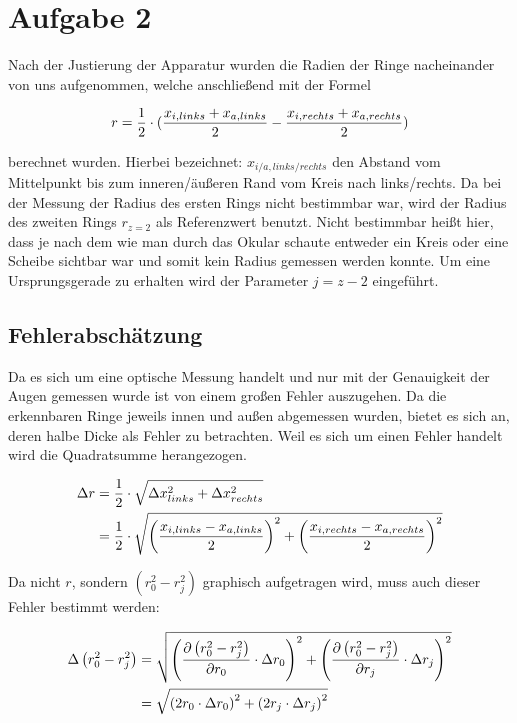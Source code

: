 \section{Aufgabe 2}
Nach der Justierung der Apparatur wurden die Radien der Ringe nacheinander von uns aufgenommen, welche anschließend mit der Formel

\begin{equation}
r=\frac{1}{2}\cdot (\frac{x_{i,links} + x_{a,links}}{2}-\frac{x_{i,rechts} + x_{a,rechts}}{2}) \notag
\end{equation}

berechnet wurden. Hierbei bezeichnet: \(x_{i/a,links/rechts}\) den Abstand vom Mittelpunkt bis zum inneren/äußeren Rand vom Kreis nach links/rechts. Da  bei der Messung der Radius des ersten Rings nicht bestimmbar war, wird der Radius des zweiten Rings \(r_{z=2}\) als Referenzwert benutzt. Nicht bestimmbar heißt hier, dass je nach dem wie man durch das Okular schaute entweder ein Kreis oder eine Scheibe sichtbar war und somit kein Radius gemessen werden konnte. Um eine Ursprungsgerade zu erhalten wird der Parameter \(j = z - 2\) eingeführt.

\subsection{Fehlerabschätzung}
Da es sich um eine optische Messung handelt und nur mit der Genauigkeit der Augen gemessen wurde ist von einem großen Fehler auszugehen. Da die erkennbaren Ringe jeweils innen und außen abgemessen wurden, bietet es sich an, deren halbe Dicke als Fehler zu betrachten. Weil es sich um einen Fehler handelt wird die Quadratsumme herangezogen.

\begin{align}
\Delta r &= \frac{1}{2} \cdot \sqrt{
\Delta x_{links}^2 +
\Delta x_{rechts}^2
} \notag \\
&= \frac{1}{2} \cdot \sqrt{
\left( \frac{x_{i,links} - x_{a,links}}{2} \right)^2 +
\left( \frac{x_{i,rechts} - x_{a,rechts}}{2} \right)^2
} \notag
\end{align}

Da nicht \(r\), sondern \( \left( r_0^2 - r_j^2 \right) \) graphisch aufgetragen wird, muss auch dieser Fehler bestimmt werden:

\begin{align}
\Delta \left( r_0^2 - r_j^2 \right) &= \sqrt{
\left( \frac{\partial \left( r_0^2 - r_j^2 \right)}{\partial r_0} \cdot \Delta r_0 \right)^2 +
\left( \frac{\partial \left( r_0^2 - r_j^2 \right)}{\partial r_j} \cdot \Delta r_j \right)^2
} \notag \\
 &= \sqrt{
\left( 2 r_0 \cdot \Delta r_0 \right)^2 +
\left( 2 r_j \cdot \Delta r_j \right)^2
} \notag
\end{align}
